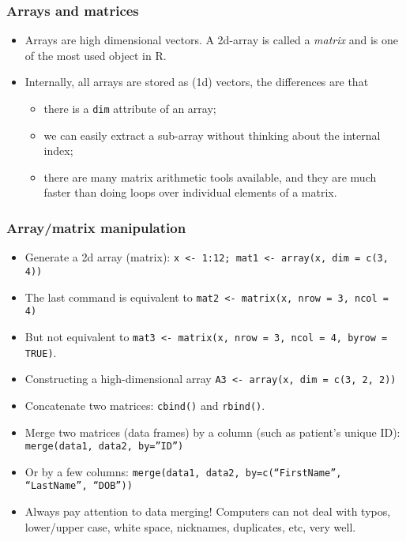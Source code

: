 \begin{frame}
  \frametitle{Arrays and matrices}
  \begin{itemize}
  \item Arrays are high dimensional vectors.  A 2d-array is called a
    \emph{matrix} and is one of the most used object in R.
  \item Internally, all arrays are stored as (1d) vectors, the
    differences are that
    \begin{itemize}
    \item there is a \texttt{dim} attribute of an array;
    \item we can easily extract a sub-array without thinking about the internal index;
    \item there are many matrix arithmetic tools available, and they are
      much faster than doing loops over individual elements of a matrix.
    \end{itemize}
  \end{itemize}
\end{frame}

\begin{frame}
  \frametitle{Array/matrix manipulation }
  \begin{itemize}
  \item Generate a 2d array (matrix): \texttt{x <- 1:12; mat1 <-
      array(x, dim = c(3, 4))}
  \item The last command is equivalent to \texttt{mat2 <- matrix(x, nrow = 3, ncol = 4)}
  \item But not equivalent to \texttt{mat3 <- matrix(x, nrow = 3, ncol = 4, byrow = TRUE)}.
  \item Constructing a high-dimensional array \texttt{A3 <- array(x,
      dim = c(3, 2, 2))}
  \item Concatenate two matrices: \texttt{cbind()} and \texttt{rbind()}.
  \item Merge two matrices (data frames) by a column (such as
    patient's unique ID):  \texttt{merge(data1, data2, by=''ID'')}
  \item Or by a few columns: \texttt{merge(data1, data2, by=c(``FirstName'', ``LastName'', ``DOB''))}
  \item Always pay attention to data merging! Computers can not deal
    with typos, lower/upper case, white space, nicknames, duplicates,
    etc, very well.
  \end{itemize}
\end{frame}

